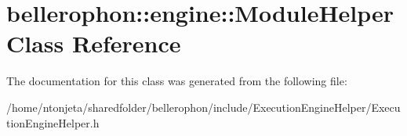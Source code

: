 \hypertarget{classbellerophon_1_1engine_1_1ModuleHelper}{}\section{bellerophon\+:\+:engine\+:\+:Module\+Helper Class Reference}
\label{classbellerophon_1_1engine_1_1ModuleHelper}


The documentation for this class was generated from the following file\+:\begin{DoxyCompactItemize}
\item 
/home/ntonjeta/sharedfolder/bellerophon/include/\+Execution\+Engine\+Helper/Execution\+Engine\+Helper.\+h\end{DoxyCompactItemize}
